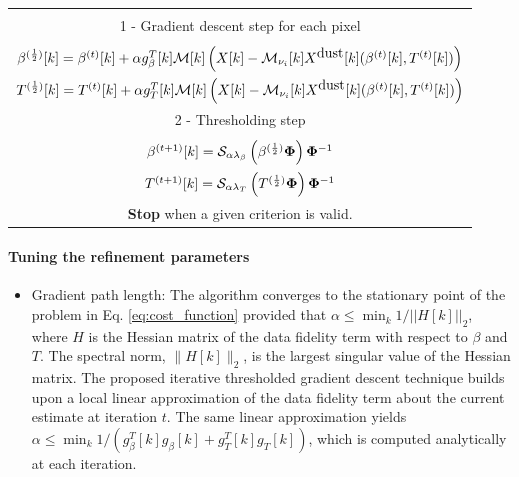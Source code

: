 \documentclass[a4paper,fleqn,usenatbib]{mnras}
\begin{document}
\begin{itemize}
\begin{center}
\begin{tabular}{|c|}
\begin{minipage}[hbt]{0.95\linewidth}
			\textsf{\bf At each iteration $t$.}\\
			
			\hspace{0.2in} \textsf{1 - Gradient descent step for each pixel} \\ \\
				\hspace{0.4in}  $\beta^{(\frac{1}{2})}[k]  =  \beta^{(t)}[k] +  \\  \alpha g_{\beta}^T[k] {\bf \mathcal{M}}[k]\left({X}[k] - {\bf \mathcal{M}}_{\nu_i}[k]{X}^{\mbox{dust}}[k](\beta^{(t)}[k],T^{(t)}[k])  \right) $\\
				\hspace{0.4in}  $T^{(\frac{1}{2})}[k]  =  T^{(t)}[k] + \\ \alpha g_{T}^T[k] {\bf \mathcal{M}}[k] \left({ X}[k] - {\bf \mathcal{M}}_{\nu_i}[k]{X}^{\mbox{dust}}[k](\beta^{(t)}[k],T^{(t)}[k])  \right) $\\
			
			\hspace{0.2in} \textsf{2 - Thresholding step} \\ \\
				\hspace{0.4in}  $\beta^{(t + 1)}[k]  =  \mathcal{S}_{\alpha \lambda_{\beta}}\left( \beta^{(\frac{1}{2})} {\bf \Phi} \right) {\bf \Phi}^{-1} $\\
				\hspace{0.4in}  $T^{(t + 1)}[k]  =  \mathcal{S}_{\alpha \lambda_{T}}\left( T^{(\frac{1}{2})} {\bf \Phi} \right) {\bf \Phi}^{-1}$ \\

			\textsf{\textbf{Stop} when a given criterion is valid.}
			
			\vspace{0.15in}
		\end{minipage}
		\\\hline
	\end{tabular}
	\vspace{0.25in}
\end{center}

\paragraph*{Tuning the refinement parameters}
\begin{itemize}
\item{Gradient path length:} The algorithm converges to the stationary point of the problem in Eq. \ref{eq:cost_function} provided that $\alpha \leq  \min_k 1/||H[k]||_2$, where $H$ is the Hessian matrix of the data fidelity term with respect to $\beta$ and $T$. The spectral norm, $\| H[k]\|_2$, is the largest singular value of the Hessian matrix. The proposed iterative thresholded gradient descent technique builds upon a local linear approximation of the data fidelity term about the current estimate at iteration $t$. The same linear approximation yields $\alpha \leq  \min_k 1/(g_{\beta}^T[k] g_{\beta}[k] +g_{T}^T[k] g_{T}[k])$, which is computed analytically at each iteration.\\


\end{itemize}
\end{itemize}
\end{document}
